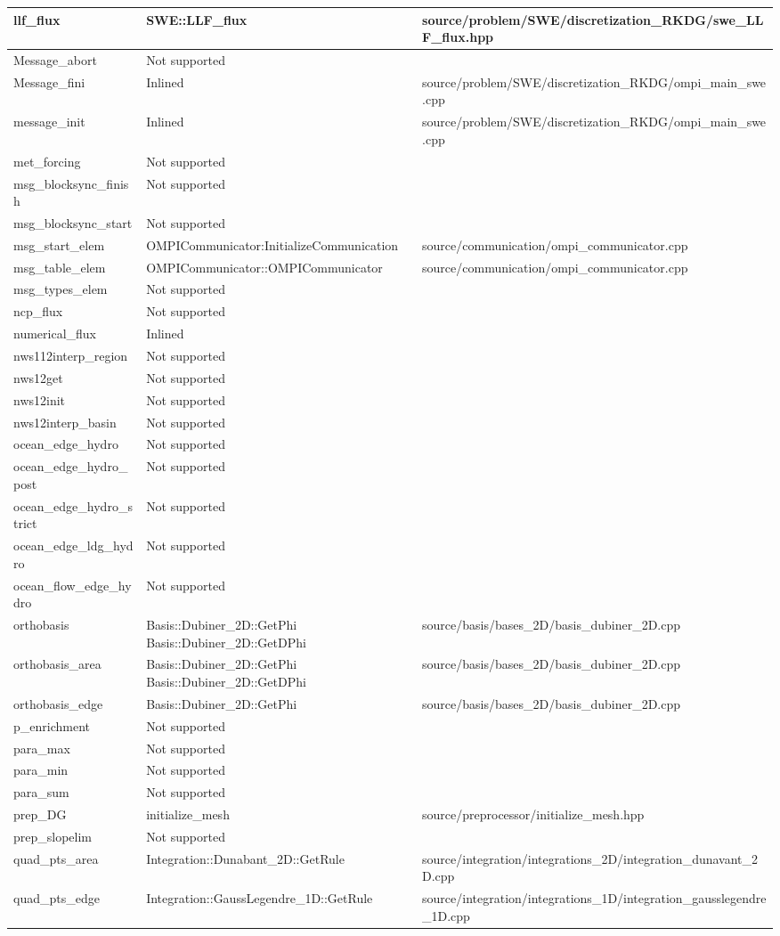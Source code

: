 {\begin{longtable}{ l | p{55mm} | p{86mm} }
llf\_flux & SWE::LLF\_flux & source/problem/SWE/discretization_RKDG/swe\_LLF\_flux.hpp
\tabularnewline \hline
Message\_abort & Not supported	
\tabularnewline \hline
Message\_fini & Inlined & source/problem/SWE/discretization_RKDG/ompi\_main\_swe.cpp
\tabularnewline \hline
message\_init & Inlined & source/problem/SWE/discretization_RKDG/ompi\_main\_swe.cpp
\tabularnewline \hline
met\_forcing & Not supported	&
\tabularnewline \hline
msg\_blocksync\_finish & Not supported &	
\tabularnewline \hline
msg\_blocksync\_start & Not supported &
\tabularnewline \hline
msg\_start\_elem & OMPICommunicator:InitializeCommunication & source/communication/ompi\_communicator.cpp
\tabularnewline \hline
msg\_table\_elem & OMPICommunicator::OMPICommunicator & source/communication/ompi\_communicator.cpp
\tabularnewline \hline
msg\_types\_elem & Not supported &	
\tabularnewline \hline
ncp\_flux & Not supported &
\tabularnewline \hline
numerical\_flux & Inlined &	
\tabularnewline \hline
nws112interp\_region & Not supported	&
\tabularnewline \hline
nws12get & Not supported &
\tabularnewline \hline
nws12init & Not supported &
\tabularnewline \hline
nws12interp\_basin & Not supported &
\tabularnewline \hline
ocean\_edge\_hydro & Not supported &
\tabularnewline \hline
ocean\_edge\_hydro\_post & Not supported &
\tabularnewline \hline
ocean\_edge\_hydro\_strict	& Not supported &	
\tabularnewline \hline
ocean\_edge\_ldg\_hydro & Not supported &
\tabularnewline \hline
ocean\_flow\_edge\_hydro & Not supported &	
\tabularnewline \hline
orthobasis & Basis::Dubiner\_2D::GetPhi \newline Basis::Dubiner\_2D::GetDPhi &	source/basis/bases\_2D/basis\_dubiner\_2D.cpp
\tabularnewline \hline
orthobasis\_area & Basis::Dubiner\_2D::GetPhi \newline Basis::Dubiner\_2D::GetDPhi & source/basis/bases\_2D/basis\_dubiner\_2D.cpp
\tabularnewline \hline
orthobasis\_edge	& Basis::Dubiner\_2D::GetPhi & source/basis/bases\_2D/basis\_dubiner\_2D.cpp
\tabularnewline \hline
p\_enrichment & Not supported &
\tabularnewline \hline
para\_max & Not supported &	
\tabularnewline \hline
para\_min & Not supported &
\tabularnewline \hline
para\_sum & Not supported &	
\tabularnewline \hline
prep\_DG	& initialize\_mesh & source/preprocessor/initialize\_mesh.hpp
\tabularnewline \hline
prep\_slopelim & Not supported &	
\tabularnewline \hline
quad\_pts\_area & Integration::Dunabant\_2D::GetRule & 	source/integration/integrations\_2D/integration\_dunavant\_2D.cpp
\tabularnewline \hline
quad\_pts\_edge & Integration::GaussLegendre\_1D::GetRule & source/integration/integrations\_1D/integration\_gausslegendre\_1D.cpp

\end{longtable}}
